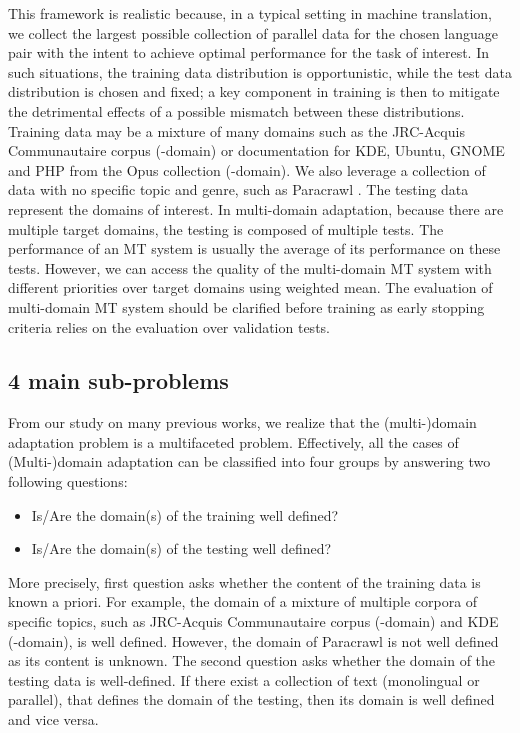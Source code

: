 This framework is realistic because, in a typical setting in machine translation, we collect the largest possible collection of parallel data for the chosen language pair with the intent to achieve optimal performance for the task of interest. In such situations, the training data distribution is opportunistic, while the test data distribution is chosen and fixed; a key component in training is then to mitigate the detrimental effects of a possible mismatch between these distributions. Training data may be a mixture of many domains such as the JRC-Acquis Communautaire corpus (-domain) \citep{Steinberger06acquis} or documentation for KDE, Ubuntu, GNOME and PHP from the Opus collection \citep{Tiedemann09news} (-domain). We also leverage a collection of data with no specific topic and genre, such as Paracrawl \citep{Banon20Paracrawl}. The testing data represent the domains of interest. In multi-domain adaptation, because there are multiple target domains, the testing is composed of multiple tests. The performance of an MT system is usually the average of its performance on these tests. However, we can access the quality of the multi-domain MT system with different priorities over target domains using weighted mean. The evaluation of multi-domain MT system should be clarified before training as early stopping criteria relies on the evaluation over validation tests.
\subsection{4 main sub-problems}
From our study on many previous works, we realize that the (multi-)domain adaptation problem is a multifaceted problem. Effectively, all the cases of (Multi-)domain adaptation can be classified into four groups by answering two following questions:
\begin{itemize}
	\item Is/Are the domain(s) of the training well defined?
	\item Is/Are the domain(s) of the testing well defined?
\end{itemize}
More precisely, first question asks whether the content of the training data is known a priori. For example, the domain of a mixture of multiple corpora of specific topics, such as JRC-Acquis Communautaire corpus (-domain) and KDE (-domain), is well defined. However, the domain of Paracrawl \citep{Banon20Paracrawl} is not well defined as its content is unknown. The second question asks whether the domain of the testing data is well-defined. If there exist a collection of text (monolingual or parallel), that defines the domain of the testing, then its domain is well defined and vice versa. 

